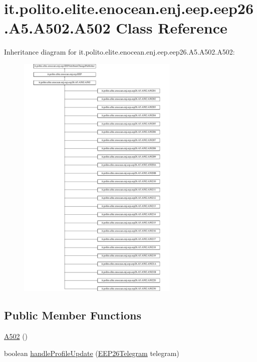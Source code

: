 \hypertarget{classit_1_1polito_1_1elite_1_1enocean_1_1enj_1_1eep_1_1eep26_1_1_a5_1_1_a502_1_1_a502}{}\section{it.\+polito.\+elite.\+enocean.\+enj.\+eep.\+eep26.\+A5.\+A502.\+A502 Class Reference}
\label{classit_1_1polito_1_1elite_1_1enocean_1_1enj_1_1eep_1_1eep26_1_1_a5_1_1_a502_1_1_a502}
Inheritance diagram for it.\+polito.\+elite.\+enocean.\+enj.\+eep.\+eep26.\+A5.\+A502.\+A502\+:\begin{figure}[H]
\begin{center}
\leavevmode
\includegraphics[height=12.000000cm]{classit_1_1polito_1_1elite_1_1enocean_1_1enj_1_1eep_1_1eep26_1_1_a5_1_1_a502_1_1_a502}
\end{center}
\end{figure}
\subsection*{Public Member Functions}
\begin{DoxyCompactItemize}
\item 
\hyperlink{classit_1_1polito_1_1elite_1_1enocean_1_1enj_1_1eep_1_1eep26_1_1_a5_1_1_a502_1_1_a502_a88ad286c724ce0988c3bdcaec2e82cee}{A502} ()
\item 
boolean \hyperlink{classit_1_1polito_1_1elite_1_1enocean_1_1enj_1_1eep_1_1eep26_1_1_a5_1_1_a502_1_1_a502_a1d2b0d2847c7ff2c36cc5d7932360129}{handle\+Profile\+Update} (\hyperlink{classit_1_1polito_1_1elite_1_1enocean_1_1enj_1_1eep_1_1eep26_1_1telegram_1_1_e_e_p26_telegram}{E\+E\+P26\+Telegram} telegram)
\end{DoxyCompactItemize}

